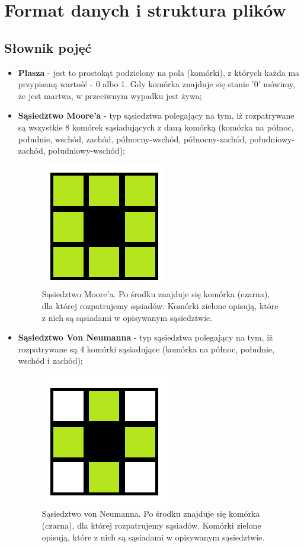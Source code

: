 \documentclass[a4paper,12pt]{article}
\begin{document}
\section{Format danych i struktura plików}
\subsection{Słownik pojęć}
\begin{itemize}
\item \textbf{Plasza} - jest to prostokąt podzielony na pola (komórki), z których każda ma przypisaną wartość - 0 albo 1. Gdy komórka znajduje się stanie '0' mówimy, że jest martwa, w przeciwnym wypadku jest żywa;
\item \textbf{Sąsiedztwo Moore'a} - typ sąsiedztwa polegający na tym, iż rozpatrywane są wszystkie 8 komórek sąsiadujących z daną komórką (komórka na północ, południe, wschód, zachód, północny-wschód, północny-zachód, południowy-zachód, południowy-wschód);
\begin{figure}[H]
	\centering
    \includegraphics[scale=1]{moore.png}
    \caption{Sąsiedztwo Moore'a. Po środku znajduje się komórka (czarna), dla której rozpatrujemy sąsiadów. Komórki zielone opisują, które z nich są sąsiadami w opisywanym sąsiedztwie.}
\end{figure}
\item \textbf{Sąsiedztwo Von Neumanna} - typ sąsiedztwa polegający na tym, iż rozpatrywane są 4 komórki sąsiadujące (komórka na północ, południe, wschód i zachód);
\begin{figure}[H]
	\centering
    \includegraphics[scale=1]{von_neumann.png}
    \caption{Sąsiedztwo von Neumanna. Po środku znajduje się komórka (czarna), dla której rozpatrujemy sąsiadów. Komórki zielone opisują, które z nich są sąsiadami w opisywanym sąsiedztwie.}
\end{figure}
\end{itemize}
\end{document}
